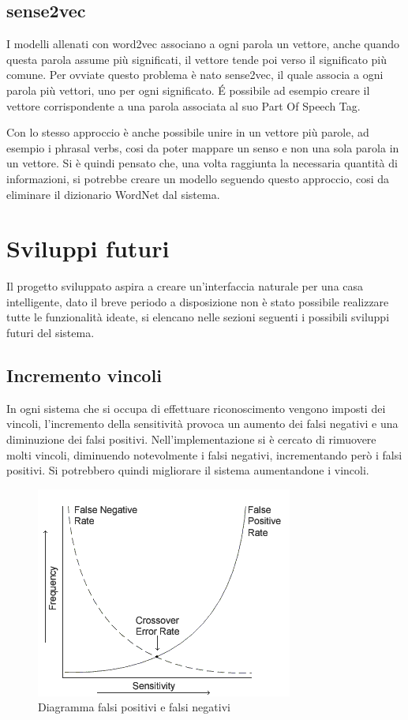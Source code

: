 \documentclass[twoside]{supsistudent}
\begin{document}
\section{sense2vec}
I modelli allenati con word2vec associano a ogni parola un vettore, anche quando questa parola assume più significati, il vettore tende poi verso il significato più comune. Per ovviate questo problema è nato sense2vec, il quale associa a ogni parola più vettori, uno per ogni significato. É possibile ad esempio creare il vettore corrispondente a una parola associata al suo Part Of Speech Tag.  \cite{posCategories} \cite{sense2vec} 

Con lo stesso approccio è anche possibile unire in un vettore più parole, ad esempio i phrasal verbs, cosi da poter mappare un senso e non una sola parola in un vettore. Si è quindi pensato che, una volta raggiunta la necessaria quantità di informazioni, si potrebbe creare un modello seguendo questo approccio, cosi da eliminare il dizionario WordNet dal sistema.

\chapter{Sviluppi futuri}
Il progetto sviluppato aspira a creare un'interfaccia naturale per una casa intelligente, dato il breve periodo a disposizione non è stato possibile realizzare tutte le funzionalità ideate, si elencano nelle sezioni seguenti i possibili sviluppi futuri del sistema.
\section{Incremento vincoli}
In ogni sistema che si occupa di effettuare riconoscimento vengono imposti dei vincoli, l'incremento della sensitività provoca un aumento dei falsi negativi e una diminuzione dei falsi positivi.
Nell'implementazione si è cercato di rimuovere molti vincoli, diminuendo notevolmente i falsi negativi, incrementando però i falsi positivi.
Si potrebbero quindi migliorare il sistema aumentandone i vincoli.
\begin{figure}[H]
\centering
\includegraphics[scale=0.8]{falseRate}
\caption{Diagramma falsi positivi e falsi negativi}
\label{fig:pose}
\end{figure}
\end{document}
